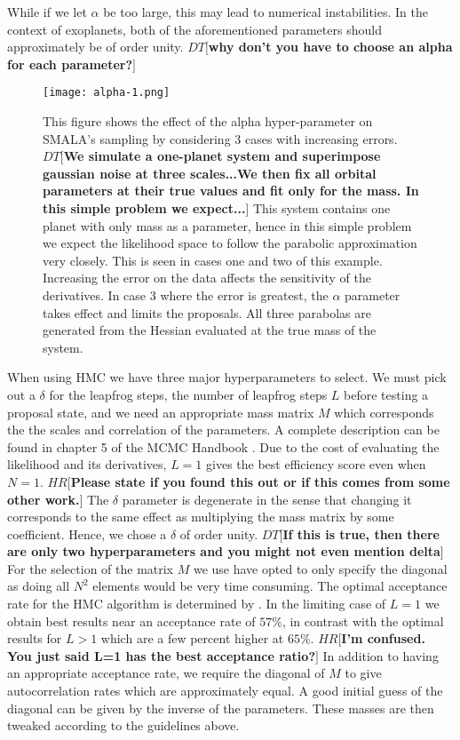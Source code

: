 \documentclass{aa}
\def\memohr#1{\color{blue}$HR[${\bf #1}$]$ \color{black}}
\def\memodt#1{\color{green}$DT[${\bf #1}$]$ \color{black}}
\begin{document}
While if we let $\alpha$ be too large, this may lead to numerical instabilities. 
In the context of exoplanets, both of the aforementioned parameters should approximately be of order unity.
\memodt{why don't you have to choose an alpha for each parameter?}

\begin{figure}
\centering
\texttt{[image: alpha-1.png]}
   \caption{This figure shows the effect of the alpha hyper-parameter on SMALA's sampling by considering 3 cases with increasing errors. 
\memodt{We simulate a one-planet system and superimpose gaussian noise at three scales...We then fix all orbital parameters at their true values and fit only for the mass. In this simple problem we expect...}
This system contains one planet with only mass as a parameter, hence in this simple problem we expect the likelihood space to follow the parabolic approximation very closely. 
This is seen in cases one and two of this example. 
Increasing the error on the data affects the sensitivity of the derivatives.
In case 3 where the error is greatest, the $\alpha$ parameter takes effect and limits the proposals. 
All three parabolas are generated from the Hessian evaluated at the true mass of the system.}
      \label{alpha}
\end{figure}

When using HMC we have three major hyperparameters to select. 
We must pick out a $\delta$ for the leapfrog steps, the number of leapfrog steps $L$ before testing a proposal state, and we need an appropriate mass matrix $M$ which corresponds the the scales and correlation of the parameters. 
A complete description can be found in chapter 5 of the MCMC Handbook \cite{1206.1901}. 
Due to the cost of evaluating the likelihood and its derivatives, $L=1$ gives the best efficiency score even when $N=1$. 
\memohr{Please state if you found this out or if this comes from some other work.}
The $\delta$ parameter is degenerate in the sense that changing it corresponds to the same effect as multiplying the mass matrix by some coefficient.
Hence, we chose a $\delta$ of order unity. \memodt{If this is true, then there are only two hyperparameters and you might not even mention delta}
For the selection of the matrix $M$ we use have opted to only specify the diagonal as doing all $N^2$ elements would be very time consuming.
The optimal acceptance rate for the HMC algorithm is determined by \cite{1001.4460}. 
In the limiting case of $L=1$ we obtain best results near an acceptance rate of $57\%$, in contrast with the optimal results for $L>1$ which are a few percent higher at $65\%$. 
\memohr{I'm confused. You just said L=1 has the best acceptance ratio?}
In addition to having an appropriate acceptance rate, we require the diagonal of $M$ to give autocorrelation rates which are approximately equal.
A good initial guess of the diagonal can be given by the inverse of the parameters. 
These masses are then tweaked according to the guidelines above.
\end{document}
